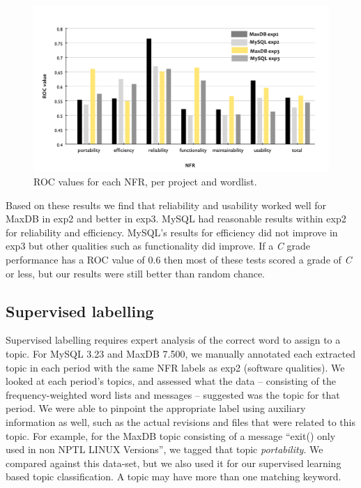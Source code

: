 \documentclass[]{sig-alternate}
\begin{document}
\begin{figure}
  \centering
 \includegraphics[width=.85\textwidth]{figures/unsupervised-bar}
 \caption{ROC values for each NFR, per project and wordlist.}

  \label{fig:maxdb-unsup-results}
\end{figure}


Based on these results we find that reliability and usability worked well for MaxDB in \textsf{exp2} and better in \textsf{exp3}. MySQL had reasonable results within \textsf{exp2} for reliability and efficiency. MySQL's results for efficiency did not improve in \textsf{exp3} but other qualities such as functionality did improve. If a \emph{C} grade performance has a ROC value of $0.6$ then most of these tests scored a grade of \emph{C} or less, but our results were still better than random chance.


\subsection{Supervised labelling}
\label{sec:suplearn}
Supervised labelling requires expert analysis of the correct word to assign to a topic. %
 For MySQL 3.23 and MaxDB 7.500, we manually annotated each extracted topic in each period with the same NFR labels as \textsf{exp2} (software qualities). We looked at each period's topics, and assessed what the data -- consisting of the frequency-weighted word lists and messages -- suggested was the topic for that period. We were able to pinpoint the appropriate label using auxiliary information as well, such as the actual revisions and files that were related to this topic. For example, for the MaxDB topic consisting of a message ``exit() only used in non NPTL LINUX Versions'', we tagged that topic \emph{portability}. We compared against this data-set, but we also used it for our supervised learning based topic classification. A topic may have more than one matching keyword.
\end{document}
